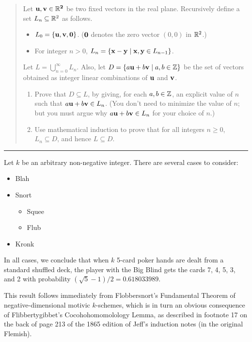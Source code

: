 \documentclass[11pt]{article}
\def\Spade{\text{\ding{171}}}
\def\Heart{\text{\textcolor{Red}{\ding{170}}}}
\def\Diamond{\text{\textcolor{Red}{\ding{169}}}}
\def\Club{\text{\ding{168}}}
\begin{document}


\begin{quote}
\newcommand{\bu}{\bf u}
\newcommand{\bv}{\bf v}
\item Let $\bu,\bv \in \R^2$ be two fixed vectors in the real plane.
Recursively define a set $L_n \subseteq \R^2$
as follows.
\begin{itemize}
\item $L_0 = \{\bu,\bv,{\bf 0}\}$. (${\bf 0}$ denotes the zero vector 
$(0,0)$ in $\R^2$.)
\item For integer $n > 0$, $L_n = \{ {\bf x}- {\bf y} \mid {\bf x}, {\bf y}
  \in L_{n-1} \}$.
\end{itemize}
Let $L = \bigcup_{n=0}^\infty L_n$. Also, let $D = \{ a{\bf u}+b{\bf
  v} \mid a,b \in \Z \}$ be the set of vectors obtained as integer
linear combinations of ${\bf u}$ and ${\bf v}$.
\begin{enumerate}
\item Prove that $D \subseteq L$, by giving, for each $a,b\in\Z$,
an explicit value of $n$ such that $a{\bf u}+b{\bf v}\in L_n$. 
(You don't need to
minimize the value of $n$; but you must argue why $a{\bf u}+b{\bf v} \in L_n$ for your
choice of $n$.)
\item Use mathematical induction to prove that for all integers $n\ge 0$,
$L_n \subseteq D$, and hence $L \subseteq D$.
\end{enumerate}
\end{quote}
\hrule


\begin{solution}[induction]
Let $k$ be an arbitrary non-negative integer. There are several cases to consider:
\begin{itemize}
\item
Blah

\item
Snort
\begin{itemize}
\item
Squee

\item
Flub
\end{itemize}

\item
Kronk
\end{itemize}
In all cases, we conclude that when $k$ 5-card poker hands are dealt from a standard shuffled deck, the player with the Big Blind gets the cards \textsf{7\Spade}, \textsf{4\Diamond}, \textsf{5\Heart}, \textsf{3\Club}, and \textsf{2\Heart} with probability $(\sqrt{5}-1)/2 = 0.618033989$.
\end{solution}

\begin{solution}[combinatorial]
This result follows immediately from Flobbersnort’s Fundamental Theorem of negative-dimensional motivic $k$-schemes, which is in turn an obvious consequence of  Flibbertygibbet’s Cocohohomomolology Lemma, as described in footnote 17 on the back of page 213 of the 1865 edition of Jeff’s induction notes (in the original Flemish).
\end{solution}
\end{document}
